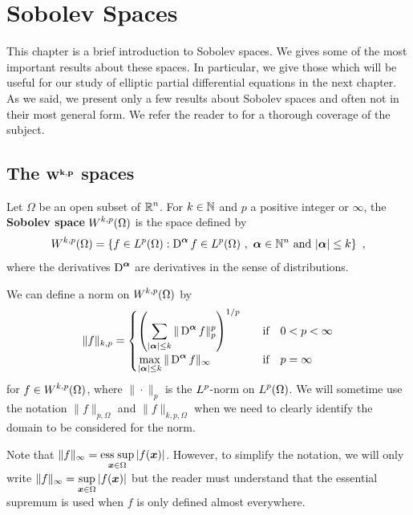 \chapter{Sobolev Spaces} \label{sobolev_chap}

This chapter is a brief introduction to Sobolev spaces.  We gives some
of the most important results about these spaces.  In particular, we
give those which will be useful for our study of elliptic partial
differential equations in the next chapter.  As we said, we present only a
few results about Sobolev spaces and often not in their most general
form.  We refer the reader to \cite{Ad} for a thorough coverage of the
subject.

\section{The $\displaystyle \mathbf{W^{k,p}}$
spaces} \label{sobolev_def}

\begin{defn} \label{sob_1st_wkp}
Let $\Omega$ be an open subset of $\displaystyle \mathbb{R}^n$.  For $k\in \mathbb{N}$ and
$p$ a positive integer or $\infty$, the
{\bfseries Sobolev space}
$\displaystyle W^{k,p}(\Omega)$ is the space defined by
\[
W^{k,p}(\Omega) = \left\{ f \in L^p(\Omega) : \operatorname{D}^{{\bm{\alpha}}} f \in
L^p(\Omega) \ , \ {\bm{\alpha}} \in \mathbb{N}^n \ \text{and}
\ |{\bm{\alpha}}| \leq k \right\} \ ,
\]
where the derivatives $\displaystyle \operatorname{D}^{{\bm{\alpha}}}$ are derivatives in
the sense of distributions.
\end{defn}

We can define a norm on $\displaystyle W^{k,p}(\Omega)$ by
\begin{equation} \label{sob_norm_wkp}
\| f \|_{k,p} =
\begin{cases}
\displaystyle \left( \sum_{|{\bm{\alpha}}|\leq k} \|
\operatorname{D}^{{\bm{\alpha}}} f \|_p^p \right)^{1/p}&
\quad \text{if} \quad 0 < p < \infty \\
\displaystyle \max_{|{\bm{\alpha}}|\leq k} \| \operatorname{D}^{{\bm{\alpha}}} f \|_\infty &
\quad \text{if} \quad p = \infty
\end{cases}
\end{equation}
for $\displaystyle f \in W^{k,p}(\Omega)$, where $\|\cdot\|_p$ is the
$\displaystyle L^p$-norm on $\displaystyle L^p(\Omega)$.
We will sometime use the notation $\|f\|_{p,\Omega}$ and
$\|f\|_{k,p,\Omega}$ when we need to clearly identify the domain to be
considered for the norm.

Note that
$\displaystyle \|f\|_\infty = \operatorname*{ess\;sup}_{{\bm{x}} \in \Omega} |f({\bm{x}})|$.
However, to simplify the notation, we will only write
$\displaystyle \|f\|_\infty = \sup_{{\bm{x}} \in \Omega} |f({\bm{x}})|$
but the reader must understand that the essential supremum is used
when $f$ is only defined almost everywhere.

